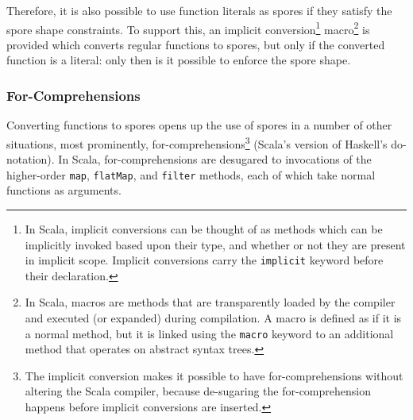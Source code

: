 \documentclass{llncs}
\begin{document}
Therefore, it is also possible to use function literals as spores if they
satisfy the spore shape constraints. To support this, an implicit
conversion\footnote{In Scala, implicit conversions can be thought of as methods which can be implicitly invoked based upon their type, and whether or not they are present in implicit scope. Implicit conversions carry the \texttt{implicit} keyword before their declaration.}
macro\footnote{In Scala, macros are methods that are transparently loaded by the compiler and executed (or expanded) during compilation. A macro is defined as if it is a normal method, but it is linked using the \texttt{macro} keyword to an additional method that operates on abstract syntax trees.} is provided which converts regular
functions to spores, but only if the converted function is a literal: only
then is it possible to enforce the spore shape.

\subsubsection{For-Comprehensions}

Converting functions to spores opens up the use of spores in a number of other
situations, most prominently, for-comprehensions\footnote{The implicit
conversion makes it possible to have for-comprehensions without altering the
Scala compiler, because de-sugaring the for-comprehension happens before
implicit conversions are inserted.} (Scala's version of Haskell's do-
notation). In Scala, for-comprehensions are desugared to invocations of the
higher-order \verb|map|, \verb|flatMap|, and \verb|filter|
methods, each of which take normal functions as arguments.






\end{document}
